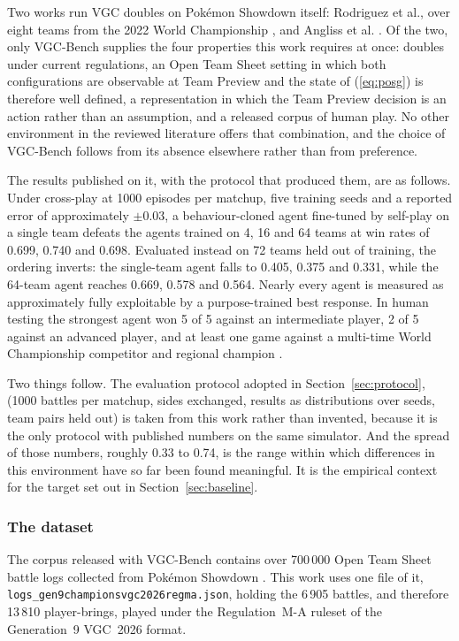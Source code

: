 \documentclass[conference]{IEEEtran}
\begin{document}
Two works run VGC doubles on Pok\'emon Showdown itself: Rodriguez et al., over
eight teams from the 2022 World Championship \cite{rodriguez2024}, and Angliss
et al. \cite{angliss2026}. Of the two, only VGC-Bench supplies the four
properties this work requires at once: doubles under current regulations, an
Open Team Sheet setting in which both configurations are observable at Team
Preview and the state of (\ref{eq:posg}) is therefore well defined, a
representation in which the Team Preview decision is an action rather than an
assumption, and a released corpus of human play. No other environment in the
reviewed literature offers that combination, and the choice of VGC-Bench
follows from its absence elsewhere rather than from preference.

The results published on it, with the protocol that produced them, are as
follows. Under cross-play at 1000 episodes per matchup, five training seeds and
a reported error of approximately $\pm 0.03$, a behaviour-cloned agent
fine-tuned by self-play on a single team defeats the agents trained on 4, 16
and 64 teams at win rates of 0.699, 0.740 and 0.698. Evaluated instead on 72
teams held out of training, the ordering inverts: the single-team agent falls
to 0.405, 0.375 and 0.331, while the 64-team agent reaches 0.669, 0.578 and
0.564. Nearly every agent is measured as approximately fully exploitable by a
purpose-trained best response. In human testing the strongest agent won 5 of 5
against an intermediate player, 2 of 5 against an advanced player, and at least
one game against a multi-time World Championship competitor and regional
champion \cite{angliss2026}.

Two things follow. The evaluation protocol adopted in
Section~\ref{sec:protocol}, (1000 battles per matchup, sides exchanged,
results as distributions over seeds, team pairs held out) is taken from this
work rather than invented, because it is the only protocol with published
numbers on the same simulator. And the spread of those numbers, roughly 0.33 to
0.74, is the range within which differences in this environment have so far
been found meaningful. It is the empirical context for the target set out in
Section~\ref{sec:baseline}.

\subsubsection{The dataset}
The corpus released with VGC-Bench contains over 700\,000 Open Team Sheet
battle logs collected from Pok\'emon Showdown \cite{angliss2026}. This work
uses one file of it, \texttt{logs\_gen9championsvgc2026regma.json}, holding the
6\,905 battles, and therefore 13\,810 player-brings, played under the
Regulation~M-A ruleset of the Generation~9 VGC~2026 format.
\end{document}
